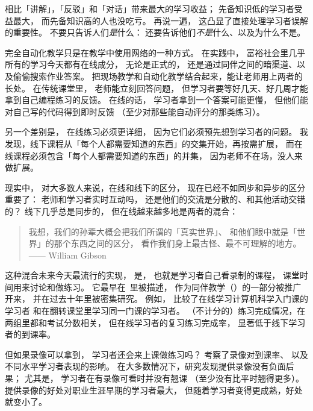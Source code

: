 相比「讲解」，「反驳」和「对话」带来最大的学习收益；
先备知识低的学习者受益最大，
而先备知识高的人也没吃亏。
再说一遍，
这凸显了直接处理学习者误解的重要性。
不要只告诉人们\emph{是}什么：
还要告诉他们\emph{不是}什么、以及为什么不是。


完全自动化教学只是在教学中使用网络的一种方式。
在实践中，
富裕社会里几乎所有的学习今天都有在线成分，
无论是正式的，
还是通过同伴之间的暗渠道、以及偷偷搜索作业答案。
把现场教学和自动化教学结合起来，能让老师用上两者的长处。
在传统课堂里，
老师能立刻回答问题，
但学习者要等好几天、好几周才能拿到自己编程练习的反馈。
在线的话，
学习者拿到一个答案可能更慢，
但他们能对自己写的代码得到即时反馈
（至少对那些能自动评分的那类练习）。

另一个差别是，
在线练习必须更详细，
因为它们必须预先想到学习者的问题。
我发现，线下课程从「每个人都需要知道的东西」的交集开始，再按需扩展，
而在线课程必须包含「每个人都需要知道的东西」的并集，
因为老师不在场，没人来做扩展。

现实中，
对大多数人来说，在线和线下的区分，
现在已经不如同步和异步的区分重要了：
老师和学习者实时互动吗，
还是他们的交流是分散的、和其他活动交错的？
线下几乎总是同步的，
但在线越来越多地是两者的混合：

\begin{quote}

  我想，我们的孙辈大概会把我们所谓的「真实世界」、
  和他们眼中就是「世界」的那个东西之间的区分，
  看作我们身上最古怪、最不可理解的地方。\\
  —— William Gibson

\end{quote}

这种混合未来今天最流行的实现，
是，
也就是学习者自己看录制的课程，
课堂时间用来讨论和做练习。
它最早在~\cite{King1993}里被描述，
作为同伴教学（）的一部分被推广开来，
并在过去十年里被密集研究。
例如，
\cite{Camp2016}比较了在线学习计算机科学入门课的学习者
和在翻转课堂里学习同一门课的学习者。
（不计分的）练习完成情况，在两组里都和考试分数相关，
但在线学习者的复习练习完成率，
显著低于线下学习者的到课率。

但如果录像可以拿到，
学习者还会来上课做练习吗？
\cite{Nord2017}考察了录像对到课率、
以及不同水平学习者表现的影响。
在大多数情况下，研究发现提供录像没有负面后果；
尤其是，
学习者在有录像可看时并没有翘课
（至少没有比平时翘得更多）。
提供录像的好处对职业生涯早期的学习者最大，
但随着学习者变得更成熟，好处就变小了。

